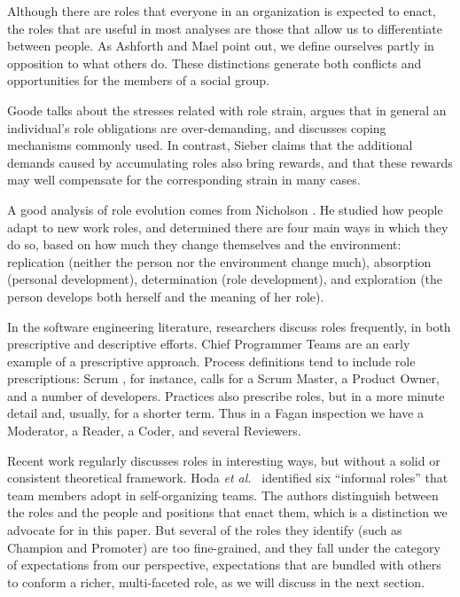 \documentclass[10pt, conference, compsocconf]{IEEEtran}
\begin{document}
Although there are roles that everyone in an organization is expected to enact, the roles that are useful in most analyses are those that allow us to differentiate between people. As Ashforth and Mael \cite{Ashforth1989} point out, we define ourselves partly in opposition to what others do. These distinctions generate both conflicts and opportunities for the members of a social group.

Goode \cite{Goode1960} talks about the stresses related with role strain, argues that in general an individual's role obligations are over-demanding, and discusses coping mechanisms commonly used. In contrast, Sieber \cite{Sieber1974} claims that the additional demands caused by accumulating roles also bring rewards, and that these rewards may well compensate for the corresponding strain in many cases. 

A good analysis of role evolution comes from Nicholson \cite{Nicholson1984}. He studied how people adapt to new work roles, and determined there are four main ways in which they do so, based on how much they change themselves and the environment: replication (neither the person nor the environment change much), absorption (personal development), determination (role development), and exploration (the person develops both herself and the meaning of her role).


In the software engineering literature, researchers discuss roles frequently, in both prescriptive and descriptive efforts. Chief Programmer Teams \cite{Baker1972} are an early example of a prescriptive approach. Process definitions tend to include role prescriptions: Scrum \cite{Schwaber2001}, for instance, calls for a Scrum Master, a Product Owner, and a number of developers. Practices also prescribe roles, but in a more minute detail and, usually, for a shorter term. Thus in a Fagan inspection \cite{Fagan1976} we have a Moderator, a Reader, a Coder, and several Reviewers.

Recent work regularly discusses roles in interesting ways, but without a solid or consistent theoretical framework. Hoda \emph{et al.}\ \cite{Hoda2010} identified six ``informal roles'' that team members adopt in self-organizing teams. The authors distinguish between the roles and the people and positions that enact them, which is a distinction we advocate for in this paper. But several of the roles they identify (such as Champion and Promoter) are too fine-grained, and they fall under the category of expectations from our perspective, expectations that are bundled with others to conform a richer, multi-faceted role, as we will discuss in the next section.
\end{document}

